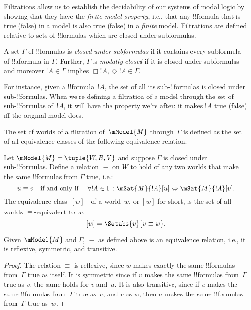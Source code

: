\documentclass[../../../include/open-logic-section]{subfiles}
\begin{document}


Filtrations allow us to establish the decidability of our systems of
modal logic by showing that they have the \emph{finite model
  property}, i.e., that any !!{formula} that is true (false) in a
model is also true (false) in a \emph{finite} model.  Filtrations are
defined relative to sets of !!{formula}s which are closed under
subformulas.

\begin{defn}
  A set $\Gamma$ of !!{formula}s is \emph{closed under subformulas} if it
  contains every subformula of !!a{formula} in $\Gamma$. Further,
  $\Gamma$ is \emph{modally closed} if it is closed under subformulas
  and moreover $!A \in \Gamma$ implies $\Box!A,
  \Diamond!A \in \Gamma$. 
\end{defn}

For instance, given a !!{formula}~$!A$, the set of all its
sub-!!{formula}s is closed under sub-!!{formula}s. When we're defining
a filtration of a model through the set of sub-!!{formula}s of~$!A$,
it will have the property we're after: it makes $!A$ true (false) iff
the original model does.

The set of worlds of a filtration of~$\mModel{M}$ through~$\Gamma$ is
defined as the set of all equivalence classes of the following
equivalence relation.

\begin{defn}
Let $\mModel{M} =\tuple{W, R, V}$ and suppose $\Gamma$ is closed under
sub-!!{formula}s. Define a relation $\equiv$ on $W$ to hold of any two
worlds that make the same !!{formula}s from $\Gamma$ true, i.e.:
\[
u \equiv v \quad \text{if and only if } \quad 
\forall !A \in \Gamma : \mSat{M}{!A}[u] \Leftrightarrow \mSat{M}{!A}[v].
\]
The equivalence class~$[w]_\equiv$ of a world~$w$, or $[w]$ for short,
is the set of all worlds $\equiv$-equivalent to~$w$:
\[
[w] = \Setabs{v}{v \equiv w}.
\]
\end{defn}

\begin{prop}
  Given $\mModel{M}$ and $\Gamma$, $\equiv$ as defined above is an
  equivalence relation, i.e., it is reflexive, symmetric, and
  transitive.
\end{prop}

\begin{proof}
  The relation $\equiv$ is reflexive, since $w$ makes exactly the same
  !!{formula}s from~$\Gamma$ true as itself. It is symmetric since if
  $u$ makes the same !!{formula}s from~$\Gamma$ true as $v$, the same
  holds for $v$ and~$u$. It is also transitive, since if $u$ makes the
  same !!{formula}s from~$\Gamma$ true as~$v$, and $v$ as $w$, then
  $u$ makes the same !!{formula}s from~$\Gamma$ true as~$w$.
\end{proof}
\end{document}
